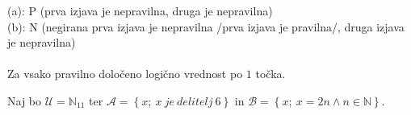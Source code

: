 \documentclass[addpoints]{exam}
\begin{document}
\begin{questions}
    \begin{solution}
        (a): P (prva izjava je nepravilna, druga je nepravilna) \\
        (b): N (negirana prva izjava je nepravilna /prva izjava je pravilna/, druga izjava je nepravilna) \\ \\
        Za vsako pravilno določeno logično vrednost po $1$ točka.
    \end{solution}



    \newpage

    \question
    Naj bo $\mathcal{U}=\mathbb{N}_{11}$ ter $\mathcal{A}=\left\{x;\ x~ je~ delitelj~ 6\right\}$ in $\mathcal{B}=\left\{x;\ x=2n\land n\in\mathbb{N}\right\}$.



\end{questions}
\end{document}
